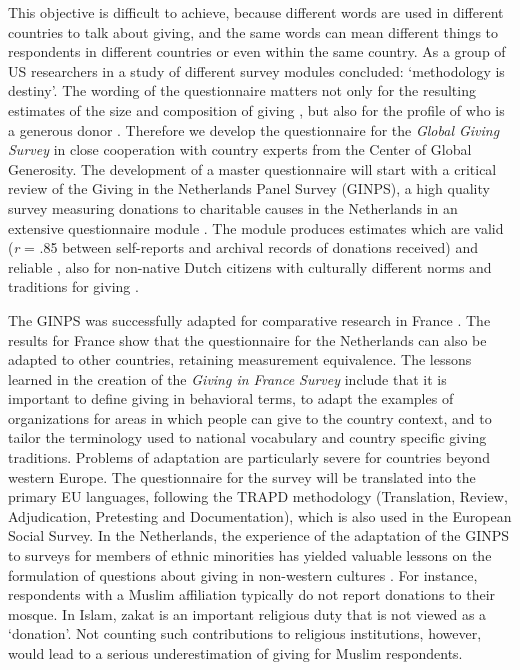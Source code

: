 \documentclass[twocolumn, serif, rga, numeric]{jote-article}
\begin{document}
This objective is difficult to achieve, because different words are used in different countries to talk about giving, and the same words can mean different things to respondents in different countries or even within the same country. As a group of US researchers in a study of different survey modules concluded: `methodology is destiny'\cite{Rooney2004}. The wording of the questionnaire matters not only for the resulting estimates of the size and composition of giving \cite{Rooney2004}, but also for the profile of who is a generous donor \cite{Bekkers2016, Rooney2005}. Therefore we develop the questionnaire for the \emph{Global Giving Survey} in close cooperation with country experts from the Center of Global Generosity.
The development of a master questionnaire will start with a critical review of the Giving in the Netherlands Panel Survey (GINPS), a high quality survey measuring donations to charitable causes in the Netherlands in an extensive questionnaire module \cite{Bekkers2011d, Bekkers2006a}. The module produces estimates which are valid (\emph{r} = .85 between self-reports and archival records of donations received)\cite{Bekkers2011d} and reliable \cite{Bekkers2012}, also for non-native Dutch citizens with culturally different norms and traditions for giving \cite{Carabain2012}.

The GINPS was successfully adapted for comparative research in France \cite{Wiepking2009a}. The results for France show that the questionnaire for the Netherlands can also be adapted to other countries, retaining measurement equivalence. The lessons learned in the creation of the \emph{Giving in France Survey} include that it is important to define giving in behavioral terms, to adapt the examples of organizations for areas in which people can give to the country context, and to tailor the terminology used to national vocabulary and country specific giving traditions. Problems of adaptation are particularly severe for countries beyond western Europe. The questionnaire for the survey will be translated into the primary EU languages, following the TRAPD methodology (Translation, Review, Adjudication, Pretesting and Documentation)\cite{Harkness2008}, which is also used in the European Social Survey. In the Netherlands, the experience of the adaptation of the GINPS to surveys for members of ethnic minorities has yielded valuable lessons on the formulation of questions about giving in non-western cultures \cite{Carabain2012}. For instance, respondents with a Muslim affiliation typically do not report donations to their mosque. In Islam, zakat is an important religious duty that is not viewed as a `donation'. Not counting such contributions to religious institutions, however, would lead to a serious underestimation of giving for Muslim respondents.
\end{document}
